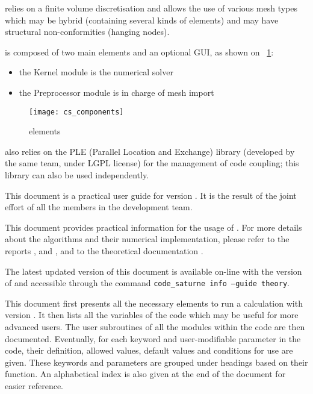\CS relies on a finite volume discretisation and allows the use of
various mesh types which may be hybrid (containing several kinds of
elements) and may have structural non-conformities (hanging nodes).


\CS is composed of two main elements and an optional GUI,
as shown on \figurename~\ref{fig:elements}:
\begin{itemize}
\item the Kernel module is the numerical solver
\item the Preprocessor module is in charge of mesh import\\
\end{itemize}

\begin{figure}[!h]
\centerline{
\texttt{[image: cs\_components]}}
\caption{\CS elements}\label{fig:elements}
\end{figure}

\indent\CS also relies on the PLE (Parallel Location and Exchange) library (developed by
the same team, under LGPL license) for the management of code coupling;
this library can also be used independently.

This document is a practical user guide for \CS version \verscs.
It is the result of the joint effort of
all the members in the development team.

This document provides practical information for the usage of \CS.
For more details about the algorithms and their numerical implementation,
please refer to the reports
 \cite{ijvf}, \cite{boucker00} and \cite{mechitoua98},
and to the theoretical documentation \cite{theory}.

The latest updated version of this document is available on-line with the version of \CS
and accessible through the command
\texttt{code\_saturne info --guide theory}.

This document first
presents all the necessary elements to run a calculation
with \CS version \verscs. It then lists all the variables of the code
which may be useful for more advanced users.
The user subroutines of all the modules within the code are then documented.
Eventually, for each keyword and user-modifiable parameter in the code,
their definition, allowed values, default values and conditions for use are given.
These keywords and parameters are grouped under headings
based on their function. An alphabetical index is also given at the end of
the document for easier reference.

